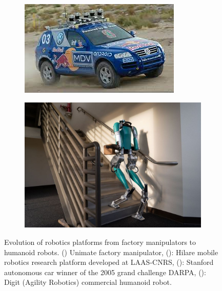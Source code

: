 \begin{figure}[h]
    \begin{subfigure}{0.49\textwidth}
        \includegraphics[width=\textwidth]{figures/darpa_car_stanford.jpeg}
        \caption{}
        \label{fig:darpa_stanford}
    \end{subfigure}%
    \hspace{0.5cm}
    \begin{subfigure}{0.44\textwidth}
        \includegraphics[width=\textwidth]{figures/digit.jpg}
        \caption{}
        \label{fig:digit}
    \end{subfigure}%
    \caption{Evolution of robotics platforms from factory manipulators to humanoid robots. () Unimate factory manipulator, 
    (): Hilare mobile robotics research platform developed at LAAS-CNRS, (): Stanford autonomous car winner of the 2005 grand challenge DARPA, 
    (): Digit (Agility Robotics) commercial humanoid robot.}

\end{figure}

